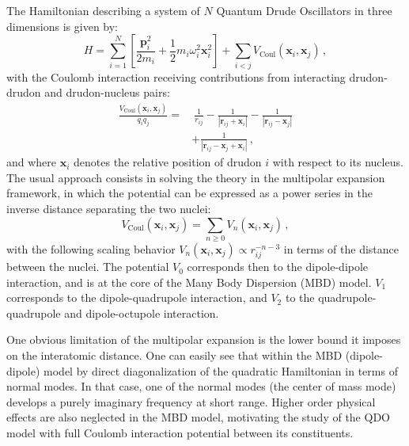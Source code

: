 \documentclass[reprint, amsmath, amssymb, aps, pra]{revtex4-2}
\begin{document}
        The Hamiltonian describing a system of $N$ Quantum Drude Oscillators in three dimensions is given by:
        \begin{equation}
        \label{eq:full_QDO_Hamiltonian}
            H=\sum_{i=1}^N\left[\frac{\bm{p} _i^2}{2m_i} + \frac{1}{2}m_i\omega_i^2\bm{x} _i^2\right] +\sum_{i<j}V_\text{Coul}\left(\bm{x} _i, \bm{x} _j\right)\,,
        \end{equation}
        with the Coulomb interaction receiving contributions from interacting drudon-drudon and drudon-nucleus pairs:
        \begin{equation}
        \label{eq:full_coulomb_potential}
        \begin{split}
            \frac{V_\text{Coul}\left(\bm{x} _i, \bm{x} _j\right)}{q_iq_j}=&\ \frac{1}{r_{ij}} - \frac{1}{|\bm{r}_{ij}
            + \bm{x} _i|} - \frac{1}{|\bm{r}_{ij}  - \bm{x} _j|} \\
            & + \frac{1}{|\bm{r}_{ij} - \bm{x} _j + \bm{x} _i|}\,,
        \end{split}
        \end{equation}
        and where $\bm x_i$ denotes the relative position of drudon $i$ with respect to its nucleus. The usual approach consists in solving the theory in the multipolar expansion framework, in which the potential can be expressed as a power series in the inverse distance separating the two nuclei:
        \begin{equation}
            V_\text{Coul}\left(\bm{x} _i, \bm{x} _j\right)= \sum_{n\geq 0} V_n\left(\bm{x} _i, \bm{x} _j\right)\,,
        \end{equation}
        with the following scaling behavior $V_n\left(\bm{x} _i, \bm{x} _j\right)\propto r_{ij}^{-n-3}$ in terms of the distance between the nuclei.
        The potential $V_0$ corresponds then to the dipole-dipole interaction, and is at the core of the Many Body Dispersion (MBD) model. $V_1$ corresponds to the dipole-quadrupole interaction, and $V_2$ to the quadrupole-quadrupole and dipole-octupole interaction.

        One obvious limitation of the multipolar expansion is the lower bound it imposes on the interatomic distance. One can easily see that within the MBD (dipole-dipole) model by direct diagonalization of the quadratic Hamiltonian in terms of normal modes. In that case, one of the normal modes (the center of mass mode) develops a purely imaginary frequency at short range. Higher order physical effects are also neglected in the MBD model, motivating the study of the QDO model with full Coulomb interaction potential between its constituents.
\end{document}
